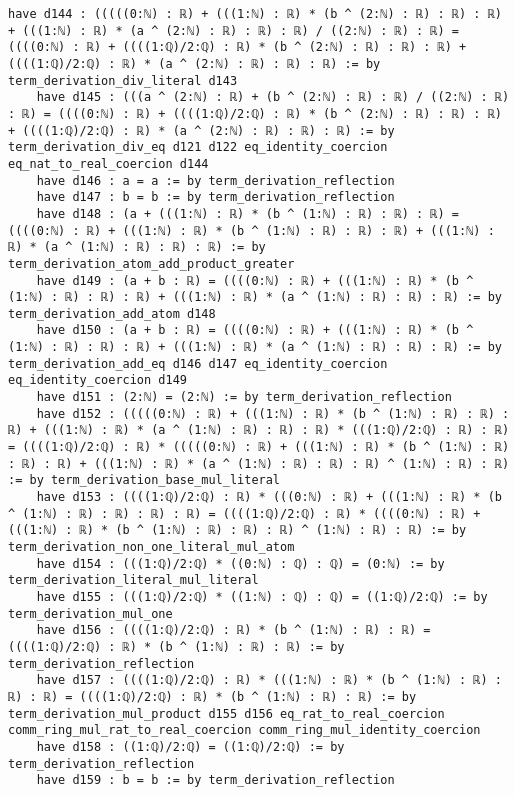 \documentclass{article}
\begin{document}
\begin{tcolorbox}[colback=white!10, width=\linewidth]
\begin{lstlisting}[language=Lean4]
    have d144 : (((((0:ℕ) : ℝ) + (((1:ℕ) : ℝ) * (b ^ (2:ℕ) : ℝ) : ℝ) : ℝ) + (((1:ℕ) : ℝ) * (a ^ (2:ℕ) : ℝ) : ℝ) : ℝ) / ((2:ℕ) : ℝ) : ℝ) = ((((0:ℕ) : ℝ) + ((((1:ℚ)/2:ℚ) : ℝ) * (b ^ (2:ℕ) : ℝ) : ℝ) : ℝ) + ((((1:ℚ)/2:ℚ) : ℝ) * (a ^ (2:ℕ) : ℝ) : ℝ) : ℝ) := by term_derivation_div_literal d143
    have d145 : (((a ^ (2:ℕ) : ℝ) + (b ^ (2:ℕ) : ℝ) : ℝ) / ((2:ℕ) : ℝ) : ℝ) = ((((0:ℕ) : ℝ) + ((((1:ℚ)/2:ℚ) : ℝ) * (b ^ (2:ℕ) : ℝ) : ℝ) : ℝ) + ((((1:ℚ)/2:ℚ) : ℝ) * (a ^ (2:ℕ) : ℝ) : ℝ) : ℝ) := by term_derivation_div_eq d121 d122 eq_identity_coercion eq_nat_to_real_coercion d144
    have d146 : a = a := by term_derivation_reflection
    have d147 : b = b := by term_derivation_reflection
    have d148 : (a + (((1:ℕ) : ℝ) * (b ^ (1:ℕ) : ℝ) : ℝ) : ℝ) = ((((0:ℕ) : ℝ) + (((1:ℕ) : ℝ) * (b ^ (1:ℕ) : ℝ) : ℝ) : ℝ) + (((1:ℕ) : ℝ) * (a ^ (1:ℕ) : ℝ) : ℝ) : ℝ) := by term_derivation_atom_add_product_greater
    have d149 : (a + b : ℝ) = ((((0:ℕ) : ℝ) + (((1:ℕ) : ℝ) * (b ^ (1:ℕ) : ℝ) : ℝ) : ℝ) + (((1:ℕ) : ℝ) * (a ^ (1:ℕ) : ℝ) : ℝ) : ℝ) := by term_derivation_add_atom d148
    have d150 : (a + b : ℝ) = ((((0:ℕ) : ℝ) + (((1:ℕ) : ℝ) * (b ^ (1:ℕ) : ℝ) : ℝ) : ℝ) + (((1:ℕ) : ℝ) * (a ^ (1:ℕ) : ℝ) : ℝ) : ℝ) := by term_derivation_add_eq d146 d147 eq_identity_coercion eq_identity_coercion d149
    have d151 : (2:ℕ) = (2:ℕ) := by term_derivation_reflection
    have d152 : (((((0:ℕ) : ℝ) + (((1:ℕ) : ℝ) * (b ^ (1:ℕ) : ℝ) : ℝ) : ℝ) + (((1:ℕ) : ℝ) * (a ^ (1:ℕ) : ℝ) : ℝ) : ℝ) * (((1:ℚ)/2:ℚ) : ℝ) : ℝ) = ((((1:ℚ)/2:ℚ) : ℝ) * (((((0:ℕ) : ℝ) + (((1:ℕ) : ℝ) * (b ^ (1:ℕ) : ℝ) : ℝ) : ℝ) + (((1:ℕ) : ℝ) * (a ^ (1:ℕ) : ℝ) : ℝ) : ℝ) ^ (1:ℕ) : ℝ) : ℝ) := by term_derivation_base_mul_literal
    have d153 : ((((1:ℚ)/2:ℚ) : ℝ) * (((0:ℕ) : ℝ) + (((1:ℕ) : ℝ) * (b ^ (1:ℕ) : ℝ) : ℝ) : ℝ) : ℝ) = ((((1:ℚ)/2:ℚ) : ℝ) * ((((0:ℕ) : ℝ) + (((1:ℕ) : ℝ) * (b ^ (1:ℕ) : ℝ) : ℝ) : ℝ) ^ (1:ℕ) : ℝ) : ℝ) := by term_derivation_non_one_literal_mul_atom
    have d154 : (((1:ℚ)/2:ℚ) * ((0:ℕ) : ℚ) : ℚ) = (0:ℕ) := by term_derivation_literal_mul_literal
    have d155 : (((1:ℚ)/2:ℚ) * ((1:ℕ) : ℚ) : ℚ) = ((1:ℚ)/2:ℚ) := by term_derivation_mul_one
    have d156 : ((((1:ℚ)/2:ℚ) : ℝ) * (b ^ (1:ℕ) : ℝ) : ℝ) = ((((1:ℚ)/2:ℚ) : ℝ) * (b ^ (1:ℕ) : ℝ) : ℝ) := by term_derivation_reflection
    have d157 : ((((1:ℚ)/2:ℚ) : ℝ) * (((1:ℕ) : ℝ) * (b ^ (1:ℕ) : ℝ) : ℝ) : ℝ) = ((((1:ℚ)/2:ℚ) : ℝ) * (b ^ (1:ℕ) : ℝ) : ℝ) := by term_derivation_mul_product d155 d156 eq_rat_to_real_coercion comm_ring_mul_rat_to_real_coercion comm_ring_mul_identity_coercion
    have d158 : ((1:ℚ)/2:ℚ) = ((1:ℚ)/2:ℚ) := by term_derivation_reflection
    have d159 : b = b := by term_derivation_reflection

\end{lstlisting}
\end{tcolorbox}
\end{document}

